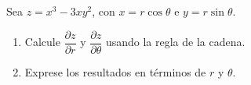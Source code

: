 Sea $z = x^3 - 3xy^2$, con $x = r\cos\theta$ e $y = r\sin\theta$.
\begin{enumerate}
    \item Calcule $\dfrac{\partial z}{\partial r}$ y $\dfrac{\partial z}{\partial \theta}$ usando la regla de la cadena.
    \item Exprese los resultados en términos de $r$ y $\theta$.
\end{enumerate}
